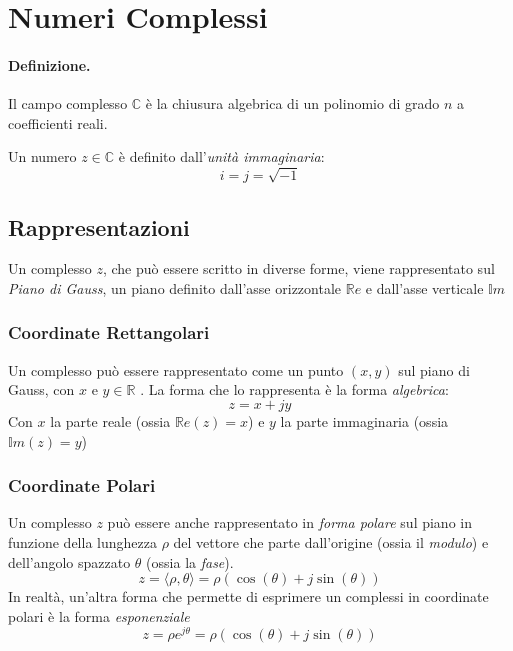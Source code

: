 \section{Numeri Complessi}
\paragraph{Definizione.}Il campo complesso $\mathbb{C}$ è la chiusura algebrica di un polinomio di grado $n$ a coefficienti reali.

Un numero $z \in \mathbb{C}$ è definito dall'\textit{unità immaginaria}:
\begin{equation}
    i = j = \sqrt{-1}
\end{equation}

\subsection{Rappresentazioni}
Un complesso $z$, che può essere scritto in diverse forme, viene rappresentato sul \textit{Piano di Gauss}, 
un piano definito dall'asse orizzontale $\mathbb{R}e$ e dall'asse verticale $\mathbb{I}m$
\subsubsection{Coordinate Rettangolari}
Un complesso può essere rappresentato come un punto $\left(x,y\right)$ sul piano di Gauss, con $x$ e $y \in \mathbb{R}$ . La forma che lo rappresenta è la forma \textit{algebrica}:
\begin{equation}
    z = x + jy
\end{equation}
Con $x$ la parte reale (ossia $\mathbb{R}e(z) = x$) e $y$ la parte immaginaria (ossia $\mathbb{I}m(z) = y$)

\subsubsection{Coordinate Polari}
Un complesso $z$ può essere anche rappresentato in \textit{forma polare} sul piano in funzione della lunghezza $\rho$ del vettore che parte dall'origine (ossia il \textit{modulo}) e dell'angolo spazzato $\theta$ (ossia la \textit{fase}).
\begin{equation}
    z = \langle \rho, \theta \rangle = \rho\left(\cos\left(\theta\right) + j\sin\left(\theta\right) \right)
\end{equation}
In realtà, un'altra forma che permette di esprimere un complessi in coordinate polari è la forma \textit{esponenziale}
\begin{equation}
    z = \rho e^{j\theta} = \rho\left(\cos\left(\theta\right) + j\sin\left(\theta\right) \right) 
\end{equation} 



